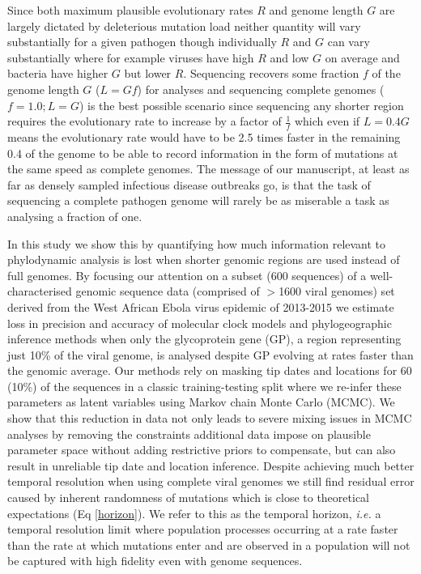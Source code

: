 \documentclass{bmcart}
\begin{document}
Since both maximum plausible evolutionary rates $R$ and genome length $G$ are largely dictated by deleterious mutation load neither quantity will vary substantially for a given pathogen though individually $R$ and $G$ can vary substantially where for example viruses have high $R$ and low $G$ on average and bacteria have higher $G$ but lower $R$.
Sequencing recovers some fraction $f$ of the genome length $G$ ($L=Gf$) for analyses and sequencing complete genomes ($f=1.0; L = G$) is the best possible scenario since sequencing any shorter region requires the evolutionary rate to increase by a factor of $\frac{1}{f}$ which even if $L = 0.4 G$ means the evolutionary rate would have to be 2.5 times faster in the remaining 0.4 of the genome to be able to record information in the form of mutations at the same speed as complete genomes.
The message of our manuscript, at least as far as densely sampled infectious disease outbreaks go, is that the task of sequencing a complete pathogen genome will rarely be as miserable a task as analysing a fraction of one.

In this study we show this by quantifying how much information relevant to phylodynamic analysis is lost when shorter genomic regions are used instead of full genomes.
By focusing our attention on a subset (600 sequences) of a well-characterised genomic sequence data (comprised of $>$1600 viral genomes) set derived from the West African Ebola virus epidemic of 2013-2015 \cite{dudas_virus_2017} we estimate loss in precision and accuracy of molecular clock models and phylogeographic inference methods when only the glycoprotein gene (GP), a region representing just 10\% of the viral genome, is analysed despite GP evolving at rates faster than the genomic average.
Our methods rely on masking tip dates and locations for 60 (10\%) of the sequences in a classic training-testing split where we re-infer these parameters as latent variables using Markov chain Monte Carlo (MCMC).
We show that this reduction in data not only leads to severe mixing issues in MCMC analyses by removing the constraints additional data impose on plausible parameter space without adding restrictive priors to compensate, but can also result in unreliable tip date and location inference.
Despite achieving much better temporal resolution when using complete viral genomes we still find residual error caused by inherent randomness of mutations which is close to theoretical expectations (Eq \ref{horizon}).
We refer to this as the temporal horizon, \textit{i.e.} a temporal resolution limit where population processes occurring at a rate faster than the rate at which mutations enter and are observed in a population will not be captured with high fidelity even with genome sequences.
\end{document}
